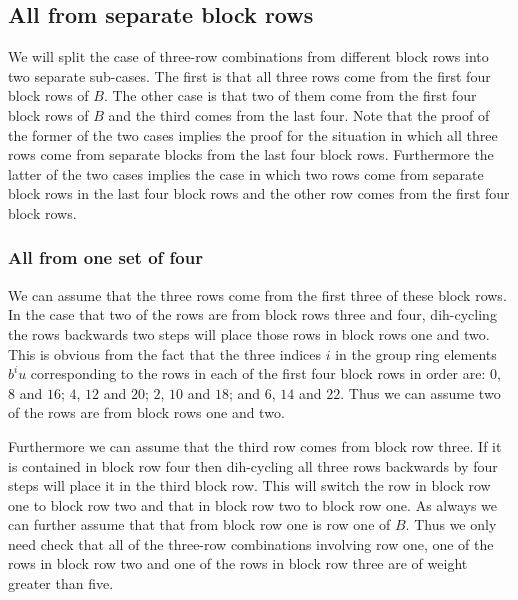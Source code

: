 \subsection{All from separate block rows}
We will split the case of three-row combinations from different block rows into two separate sub-cases.
The first is that all three rows come from the first four block rows of $B$.
The other case is that two of them come from the first four block rows of $B$ and the third comes from the last four.
Note that the proof of the former of the two cases implies the proof for the situation in which all three rows come from separate blocks from the last four block rows.
Furthermore the latter of the two cases implies the case in which two rows come from separate block rows in the last four block rows and the other row comes from the first four block rows.

\subsubsection{All from one set of four}
We can assume that the three rows come from the first three of these block rows.
In the case that two of the rows are from block rows three and four, dih-cycling the rows backwards two steps will place those rows in block rows one and two.
This is obvious from the fact that the three indices $i$ in the group ring elements $b^i u$ corresponding to the rows in each of the first four block rows in order are: $0$, $8$ and $16$; $4$, $12$ and $20$; $2$, $10$ and $18$; and $6$, $14$ and $22$.
Thus we can assume two of the rows are from block rows one and two.

Furthermore we can assume that the third row comes from block row three.
If it is contained in block row four then dih-cycling all three rows backwards by four steps will place it in the third block row.
This will switch the row in block row one to block row two and that in block row two to block row one.
As always we can further assume that that from block row one is row one of $B$.
Thus we only need check that all of the three-row combinations involving row one, one of the rows in block row two and one of the rows in block row three are of weight greater than five.

